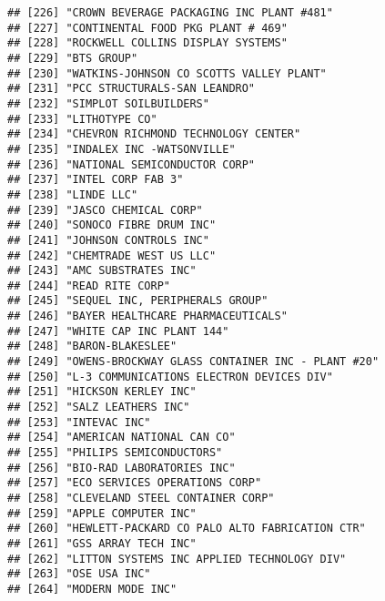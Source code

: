 \documentclass[
]{book}
\begin{document}
\begin{verbatim}
## [226] "CROWN BEVERAGE PACKAGING INC PLANT #481"                 
## [227] "CONTINENTAL FOOD PKG PLANT # 469"                        
## [228] "ROCKWELL COLLINS DISPLAY SYSTEMS"                        
## [229] "BTS GROUP"                                               
## [230] "WATKINS-JOHNSON CO SCOTTS VALLEY PLANT"                  
## [231] "PCC STRUCTURALS-SAN LEANDRO"                             
## [232] "SIMPLOT SOILBUILDERS"                                    
## [233] "LITHOTYPE CO"                                            
## [234] "CHEVRON RICHMOND TECHNOLOGY CENTER"                      
## [235] "INDALEX INC -WATSONVILLE"                                
## [236] "NATIONAL SEMICONDUCTOR CORP"                             
## [237] "INTEL CORP FAB 3"                                        
## [238] "LINDE LLC"                                               
## [239] "JASCO CHEMICAL CORP"                                     
## [240] "SONOCO FIBRE DRUM INC"                                   
## [241] "JOHNSON CONTROLS INC"                                    
## [242] "CHEMTRADE WEST US LLC"                                   
## [243] "AMC SUBSTRATES INC"                                      
## [244] "READ RITE CORP"                                          
## [245] "SEQUEL INC, PERIPHERALS GROUP"                           
## [246] "BAYER HEALTHCARE PHARMACEUTICALS"                        
## [247] "WHITE CAP INC PLANT 144"                                 
## [248] "BARON-BLAKESLEE"                                         
## [249] "OWENS-BROCKWAY GLASS CONTAINER INC - PLANT #20"          
## [250] "L-3 COMMUNICATIONS ELECTRON DEVICES DIV"                 
## [251] "HICKSON KERLEY INC"                                      
## [252] "SALZ LEATHERS INC"                                       
## [253] "INTEVAC INC"                                             
## [254] "AMERICAN NATIONAL CAN CO"                                
## [255] "PHILIPS SEMICONDUCTORS"                                  
## [256] "BIO-RAD LABORATORIES INC"                                
## [257] "ECO SERVICES OPERATIONS CORP"                            
## [258] "CLEVELAND STEEL CONTAINER CORP"                          
## [259] "APPLE COMPUTER INC"                                      
## [260] "HEWLETT-PACKARD CO PALO ALTO FABRICATION CTR"            
## [261] "GSS ARRAY TECH INC"                                      
## [262] "LITTON SYSTEMS INC APPLIED TECHNOLOGY DIV"               
## [263] "OSE USA INC"                                             
## [264] "MODERN MODE INC"                                         

\end{verbatim}
\end{document}

